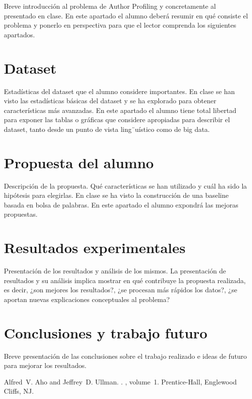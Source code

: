 \documentclass[11pt,a4paper]{article}
\begin{document}
  Breve introducci\'on al problema de Author Profiling y concretamente al presentado en clase. En este apartado el alumno deber\'a resumir en qu\'e consiste el problema y ponerlo en perspectiva para que el lector comprenda los siguientes apartados.


\section{Dataset}

Estad\'isticas del dataset que el alumno considere importantes. En clase se han visto las estad\'isticas b\'asicas del dataset y se ha explorado para obtener caracter\'isticas m\'as avanzadas. En este apartado el alumno tiene total libertad para exponer las tablas o gr\'aficas que considere apropiadas para describir el dataset, tanto desde un punto de vista ling¨u\'istico como de big data. 


\section{Propuesta del alumno}

Descripci\'on de la propuesta. Qu\'e caracter\'isticas se han utilizado y cu\'al ha sido la hip\'otesis para elegirlas. En clase se ha visto la construcci\'on de una baseline basada en bolsa de palabras. En este apartado el alumno expondr\'a las mejoras propuestas.

\section{Resultados experimentales}

Presentaci\'on de los resultados y an\'alisis de los mismos. La presentaci\'on de resultados y su an\'alisis implica mostrar en qu\'e contribuye la propuesta realizada, es decir, ¿son mejores los resultados?, ¿se procesan m\'as r\'apidos los datos?, ¿se aportan nuevas explicaciones conceptuales al problema?

\section{Conclusiones y trabajo futuro}

Breve presentaci\'on de las conclusiones sobre  el trabajo realizado e ideas de futuro para mejorar los resultados.


\begin{thebibliography}{}

Alfred~V. Aho and Jeffrey~D. Ullman.
.
, volume~1.
\newblock Prentice-{Hall}, Englewood Cliffs, NJ.

\end{thebibliography}
\end{document}
